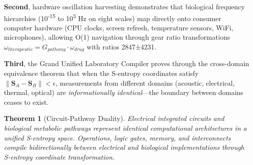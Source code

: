 \documentclass[11pt,a4paper]{article}
\newtheorem{theorem}{Theorem}[section]
\begin{document}
\textbf{Second}, hardware oscillation harvesting demonstrates that biological frequency hierarchies (10\textsuperscript{-15} to 10\textsuperscript{3} Hz on eight scales) map directly onto consumer computer hardware (CPU clocks, screen refresh, temperature sensors, WiFi, microphones), allowing O(1) navigation through gear ratio transformations $\omega_{therapeutic} = G_{pathway} \cdot \omega_{drug}$ with ratios 2847±4231\cite{hardware_lipid_llm}.

\textbf{Third}, the Grand Unified Laboratory Compiler proves through the cross-domain equivalence theorem that when the S-entropy coordinates satisfy $\|\mathbf{S}_A - \mathbf{S}_B\| < \epsilon$, measurements from different domains (acoustic, electrical, thermal, optical) are \textit{informationally identical}—the boundary between domains ceases to exist\cite{grand_unification_lab}.

\begin{theorem}[Circuit-Pathway Duality]
Electrical integrated circuits and biological metabolic pathways represent identical computational architectures in a unified S-entropy space. Operations, logic gates, memory, and interconnects compile bidirectionally between electrical and biological implementations through S-entropy coordinate transformation.
\end{theorem}
\end{document}
